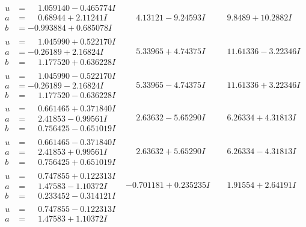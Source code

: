 \documentclass[1p]{elsarticle_modified}
\theoremstyle{definition}
\begin{document}
$$\begin{array}{c|c|c}
\begin{aligned}
u &= \phantom{-}1.059140 - 0.465774 I \\
a &= \phantom{-}0.68944 + 2.11241 I \\
b &= -0.993884 + 0.685078 I\end{aligned}
 & \phantom{-}4.13121 - 9.24593 I & \phantom{-}9.8489 + 10.2882 I \\ \hline\begin{aligned}
u &= \phantom{-}1.045990 + 0.522170 I \\
a &= -0.26189 + 2.16824 I \\
b &= \phantom{-}1.177520 + 0.636228 I\end{aligned}
 & \phantom{-}5.33965 + 4.74375 I & \phantom{-}11.61336 - 3.22346 I \\ \hline\begin{aligned}
u &= \phantom{-}1.045990 - 0.522170 I \\
a &= -0.26189 - 2.16824 I \\
b &= \phantom{-}1.177520 - 0.636228 I\end{aligned}
 & \phantom{-}5.33965 - 4.74375 I & \phantom{-}11.61336 + 3.22346 I \\ \hline\begin{aligned}
u &= \phantom{-}0.661465 + 0.371840 I \\
a &= \phantom{-}2.41853 - 0.99561 I \\
b &= \phantom{-}0.756425 - 0.651019 I\end{aligned}
 & \phantom{-}2.63632 - 5.65290 I & \phantom{-}6.26334 + 4.31813 I \\ \hline\begin{aligned}
u &= \phantom{-}0.661465 - 0.371840 I \\
a &= \phantom{-}2.41853 + 0.99561 I \\
b &= \phantom{-}0.756425 + 0.651019 I\end{aligned}
 & \phantom{-}2.63632 + 5.65290 I & \phantom{-}6.26334 - 4.31813 I \\ \hline\begin{aligned}
u &= \phantom{-}0.747855 + 0.122313 I \\
a &= \phantom{-}1.47583 - 1.10372 I \\
b &= \phantom{-}0.233452 - 0.314121 I\end{aligned}
 & -0.701181 + 0.235235 I & \phantom{-}1.91554 + 2.64191 I \\ \hline\begin{aligned}
u &= \phantom{-}0.747855 - 0.122313 I \\
a &= \phantom{-}1.47583 + 1.10372 I \\

\end{aligned}
\end{array}$$
\end{document}
